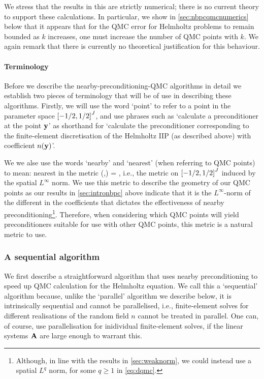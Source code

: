 We stress that the results in this  are strictly numerical; there is no current theory to support these calculations. In particular, we show in \cref{sec:nbpcqmcnumerics} below that it appears that for the QMC error for Helmholtz problems to remain bounded as $k$ increases, one must increase the number of QMC points with $k.$ We again remark that there is currently no theoretical justification for this behaviour.


\paragraph{Terminology} Before we describe the nearby-preconditioning-QMC algorithms in detail we establish two pieces of terminology that will be of use in describing these algorithms. Firstly, we will use the word `point' to refer to a point in the parameter space $\cube{J}$, and use phrases such as `calculate a preconditioner at the point $\mathbf{y}$' as shorthand for `calculate the preconditioner corresponding to the finite-element discretisation of the Helmholtz IIP (as described above) with coefficient $n(\mathbf{y})$'.

We we alse use the words `nearby' and `nearest' (when referring to QMC points) to mean: nearest in the metric
\beq\label{eq:dmqc}
\dQMC(\byo,\byt) = ,
\eeq
i.e., the metric on $\cube{J}$ induced by the spatial $L^\infty$ norm. We use this metric to describe the geometry of our QMC points as our results in \cref{sec:intronbpc} above indicate that it is the $L^\infty$-norm of the different in the coefficients that dictates the effectiveness of nearby preconditioning\footnote{Although, in line with the results in \cref{sec:weaknorm}, we could instead use a spatial $L^q$ norm, for some $q \geq 1$ in \cref{eq:dqmc}.}. Therefore, when considering which QMC points will yield preconditioners suitable for use with other QMC points, this metric is a natural metric to use.


\subsubsection{A sequential algorithm}
We first describe a straightforward algorithm that uses nearby preconditioning to speed up QMC calculation for the Helmholtz equation. We call this a `sequential' algorithm because, unlike the `parallel' algorithm we describe below, it is intrinsically sequential and cannot be parallelised, i.e., finite-element solves for different realisations of the random field $n$ cannot be treated in parallel. One can, of course, use parallelisation for inidividual finite-element solves, if the linear systems $\mathbf{A}$ are large enough to warrant this.

